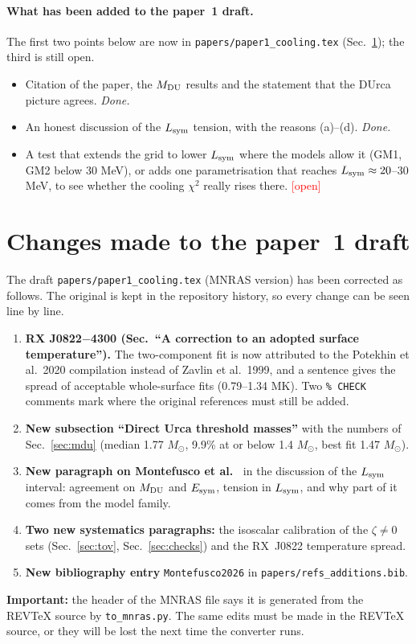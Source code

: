 \documentclass[11pt,a4paper]{article}
\newcommand{\fillin}[1]{\textcolor{red}{[#1]}}
\newcommand{\Esym}{E_{\rm sym}}
\newcommand{\Lsym}{L_{\rm sym}}
\newcommand{\Msun}{M_\odot}
\begin{document}
\paragraph{What has been added to the paper~1 draft.} The first two points below are now in \texttt{papers/paper1\_cooling.tex} (Sec.~\ref{sec:draft}); the third is still open.
\begin{itemize}
\item Citation of the paper, the $M_{\rm DU}$ results and the statement that the DUrca picture agrees. \emph{Done.}
\item An honest discussion of the $\Lsym$ tension, with the reasons (a)--(d). \emph{Done.}
\item A test that extends the grid to lower $\Lsym$ where the models allow it (GM1, GM2 below 30 MeV), or adds one parametrisation that reaches $\Lsym\approx20$--30 MeV, to see whether the cooling $\chi^2$ really rises there. \fillin{open}
\end{itemize}

\section{Changes made to the paper~1 draft}\label{sec:draft}
The draft \texttt{papers/paper1\_cooling.tex} (MNRAS version) has been corrected as follows. The original is kept in the repository history, so every change can be seen line by line.
\begin{enumerate}
\item \textbf{RX J0822$-$4300 (Sec.~``A correction to an adopted surface temperature'').} The two-component fit is now attributed to the Potekhin et al.\ 2020 compilation instead of Zavlin et al.\ 1999, and a sentence gives the spread of acceptable whole-surface fits (0.79--1.34 MK). Two \texttt{\% CHECK} comments mark where the original references must still be added.
\item \textbf{New subsection ``Direct Urca threshold masses''} with the numbers of Sec.~\ref{sec:mdu} (median 1.77 $\Msun$, 9.9\% at or below 1.4 $\Msun$, best fit 1.47 $\Msun$).
\item \textbf{New paragraph on Montefusco et al.\ \cite{Montefusco2026}} in the discussion of the $\Lsym$ interval: agreement on $M_{\rm DU}$ and $\Esym$, tension in $\Lsym$, and why part of it comes from the model family.
\item \textbf{Two new systematics paragraphs:} the isoscalar calibration of the $\zeta\ne0$ sets (Sec.~\ref{sec:tov}, Sec.~\ref{sec:checks}) and the RX~J0822 temperature spread.
\item \textbf{New bibliography entry} \texttt{Montefusco2026} in \texttt{papers/refs\_additions.bib}.
\end{enumerate}
\noindent\textbf{Important:} the header of the MNRAS file says it is generated from the REVTeX source by \texttt{to\_mnras.py}. The same edits must be made in the REVTeX source, or they will be lost the next time the converter runs.
\end{document}

